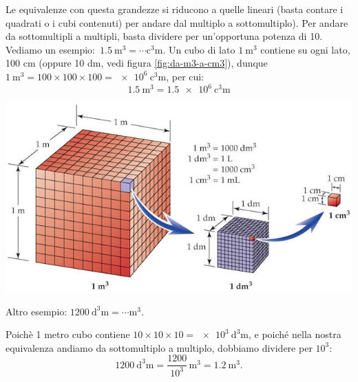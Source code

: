 \documentclass[12pt,a4paper,oneside]{book}
\theoremstyle{esercizio}
\begin{document}
Le  equivalenze con questa grandezze si riducono a quelle lineari (basta contare i quadrati o i cubi contenuti) per andare dal multiplo a sottomultiplo). Per andare da sottomultipli a  multipli, basta dividere per un'opportuna potenza di 10. Vediamo un esempio: \,$\SI{1,5}{\cubic\meter} = \cdots \si{\cubic\centi\meter}$. Un cubo di lato $\SI{1}{\cubic\meter}$ contiene su ogni lato, 100 cm (oppure 10 dm, vedi  figura \ref{fig:da-m3-a-cm3}), dunque $\SI{1}{\cubic\meter} = 100\times100\times100 = \SI{e+6}{\cubic\centi\meter}$, per cui:
\[
\SI{1,5}{\cubic\meter} = \SI{1,5e+6}{\cubic\centi\meter}
\]

\begin{minipage}{\linewidth}
	\centering
	\includegraphics[scale=0.5]{da-m3-a-cm3}
	\label{fig:da-m3-a-cm3}
\end{minipage}






Altro esempio: $\SI{1200}{\cubic\deci\meter} = \cdots \si{\cubic\meter}$.

Poichè 1 metro cubo contiene  $10\times10\times10 = \SI{e3}{\cubic\deci\meter}$,   e poiché   nella nostra equivalenza andiamo da sottomultiplo a multiplo, dobbiamo dividere per $10^3$:
\[
\SI{1200}{\cubic\deci\meter} = \frac{1200}{10^3}\,\si{\cubic\meter} = \SI{1,2}{\cubic\meter}.
\]
\end{document}
